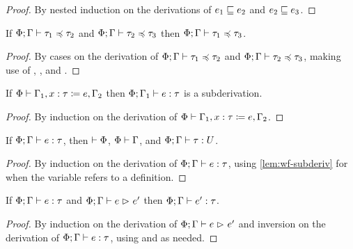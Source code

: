 \documentclass[acmsmall,review,anonymous]{acmart}\settopmatter{printfolios=true,printccs=false,printacmref=false}
\begin{document}
\begin{proof}
By nested induction on the derivations of $e_1 \mathrel{\sqsubseteq} e_2$ and $e_2 \mathrel{\sqsubseteq} e_3$.
\end{proof}

\begin{theorem} \label{thm:subtyping-trans}
If $\Phi; \Gamma \mathrel{\vdash} \tau_1 \mathrel{\preccurlyeq} \tau_2$ and $\Phi; \Gamma \mathrel{\vdash} \tau_2 \mathrel{\preccurlyeq} \tau_3$
then $\Phi; \Gamma \mathrel{\vdash} \tau_1 \mathrel{\preccurlyeq} \tau_3$.
\end{theorem}

\begin{proof}
By cases on the derivation of
$\Phi; \Gamma \mathrel{\vdash} \tau_1 \mathrel{\preccurlyeq} \tau_2$ and
$\Phi; \Gamma \mathrel{\vdash} \tau_2 \mathrel{\preccurlyeq} \tau_3$,
making use of , ,
and .
\end{proof}

\begin{lemma} \label{lem:wf-subderiv}
If $\Phi \mathrel{\vdash} \Gamma_1, x \mathrel{:} \tau \mathrel{\coloneqq} e, \Gamma_2$
then $\Phi; \Gamma_1 \mathrel{\vdash} e \mathrel{:} \tau$ is a subderivation.
\end{lemma}

\begin{proof}
By induction on the derivation of $\Phi \mathrel{\vdash} \Gamma_1, x \mathrel{:} \tau \mathrel{\coloneqq} e, \Gamma_2$.
\end{proof}

\begin{theorem}[Regularity] \label{thm:regularity}
If $\Phi; \Gamma \mathrel{\vdash} e \mathrel{:} \tau$, then $\mathrel{\vdash} \Phi$, $\Phi \mathrel{\vdash} \Gamma$,
and $\Phi; \Gamma \mathrel{\vdash} \tau \mathrel{:} U$.
\end{theorem}

\begin{proof}
By induction on the derivation of $\Phi; \Gamma \mathrel{\vdash} e \mathrel{:} \tau$,
using \cref{lem:wf-subderiv} for  when the variable refers to a definition.
\end{proof}

\begin{lemma} \label{lem:SR}
If $\Phi; \Gamma \mathrel{\vdash} e \mathrel{:} \tau$
and $\Phi; \Gamma \mathrel{\vdash} e \mathrel{\rhd}_{} e'$
then $\Phi; \Gamma \mathrel{\vdash} e' \mathrel{:} \tau$.
\end{lemma}

\begin{proof}
By induction on the derivation of $\Phi; \Gamma \mathrel{\vdash} e \mathrel{\rhd}_{} e'$
and inversion on the derivation of $\Phi; \Gamma \mathrel{\vdash} e \mathrel{:} \tau$,
using  and  as needed.
\end{proof}
\end{document}
